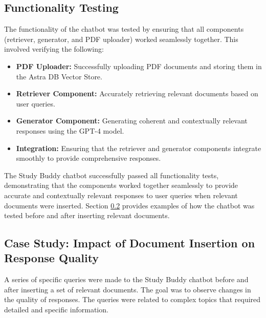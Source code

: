 \subsection{Functionality Testing}
The functionality of the chatbot was tested by ensuring that all components (retriever, generator, and PDF uploader) worked seamlessly together. This involved verifying the following:

\begin{itemize}
    \item \textbf{PDF Uploader:} Successfully uploading PDF documents and storing them in the Astra DB Vector Store.
    \item \textbf{Retriever Component:} Accurately retrieving relevant documents based on user queries.
    \item \textbf{Generator Component:} Generating coherent and contextually relevant responses using the GPT-4 model.
    \item \textbf{Integration:} Ensuring that the retriever and generator components integrate smoothly to provide comprehensive responses.
\end{itemize}
The Study Buddy chatbot successfully passed all functionality tests, demonstrating that the components worked together seamlessly to provide accurate and contextually relevant responses to user queries when relevant documents were inserted. Section \ref{document_insertion} provides examples of how the chatbot was tested before and after inserting relevant documents.

\subsection{Case Study: Impact of Document Insertion on Response Quality}\label{document_insertion}
A series of specific queries were made to the Study Buddy chatbot before and after inserting a set of relevant documents. The goal was to observe changes in the quality of responses. The queries were related to complex topics that required detailed and specific information.

